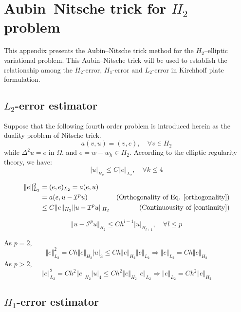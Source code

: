\section{Aubin--Nitsche trick for $H_2$ problem}
This appendix presents the Aubin--Nitsche trick method for the $H_2$--elliptic variational problem.
This Aubin--Nitsche trick will be used to establish the relationship among the $H_2$-error, $H_1$-error and $L_2$-error in Kirchhoff plate formulation.

\subsection{$L_2$-error estimator}
Suppose that the following fourth order problem is introduced herein as the duality problem of Nitsche trick.
\begin{equation}
	a(v,u) = (v,e), \quad \forall v \in H_2
\end{equation}
while $\Delta^2 u = e$ in $\Omega$, and $e = w-w_h \in H_2$.
According to the elliptic regularity theory, we have:
\begin{equation}
	\vert u \vert_{H_k} \le C \Vert e \Vert_{L_2}, \quad \forall k \le 4
\end{equation}

\begin{equation}
	\begin{aligned}
		\Vert e \Vert_{L_2}^2 &= (e,e)_{L_2} = a(e,u) & \\
		&= a(e,u - \mathcal I^p u) & (\textrm{Orthogonality of Eq. \eqref{orthogonality}}) \\
		&\le C \Vert e \Vert_{H_2} \Vert u - \mathcal I^p u \Vert_{H_2} & (\textrm{Continuousity of \eqref{continuity}})
	\end{aligned}
\end{equation}

\begin{equation}
	\Vert u - \mathcal I^p u \Vert_{H_2} \le C h^{l-1} \vert u \vert_{H_{l+1}}, \quad \forall l \le p
\end{equation}


As $p=2$,
\begin{equation}
	\Vert e \Vert_{L_2}^2 = C h \Vert e \Vert_{H_2} \vert u \vert_3
	\le C h \Vert e \Vert_{H_2} \Vert e \Vert_{L_2} 
	\Rightarrow \Vert e \Vert_{L_2} = C h \Vert e \Vert_{H_2}
\end{equation}
As $p>2$,
\begin{equation}
	\Vert e \Vert_{L_2}^2 = C h^2 \Vert e \Vert_{H_2} \vert u \vert_4
	\le C h^2 \Vert e \Vert_{H_2} \Vert e \Vert_{L_2} 
	\Rightarrow \Vert e \Vert_{L_2} = C h^2 \Vert e \Vert_{H_2}
\end{equation}

\subsection{$H_1$-error estimator}
